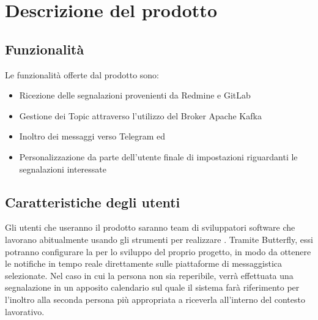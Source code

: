 \newpage
\section{Descrizione del prodotto}\label{DescrizioneGenerale}

	
	\subsection{Funzionalità}

    Le funzionalità offerte dal prodotto sono:
    \begin{itemize}
        \item Ricezione delle segnalazioni provenienti da Redmine e GitLab
        \item Gestione dei Topic attraverso l'utilizzo del Broker Apache Kafka
        \item Inoltro dei messaggi verso Telegram ed \mail
        \item Personalizzazione da parte dell'utente finale di impostazioni riguardanti le segnalazioni interessate
	\end{itemize}

	\subsection{Caratteristiche degli utenti}
    
    Gli utenti che useranno il prodotto saranno team di sviluppatori software che lavorano abitualmente usando gli strumenti per realizzare .
    Tramite Butterfly, essi potranno configurare la  per lo sviluppo del proprio progetto, in modo da ottenere le notifiche in tempo reale direttamente sulle piattaforme di messaggistica selezionate.
    Nel caso in cui la persona non sia reperibile, verrà effettuata una segnalazione in un apposito calendario sul quale il sistema farà riferimento per l'inoltro alla seconda persona più appropriata a riceverla all'interno del contesto lavorativo.

